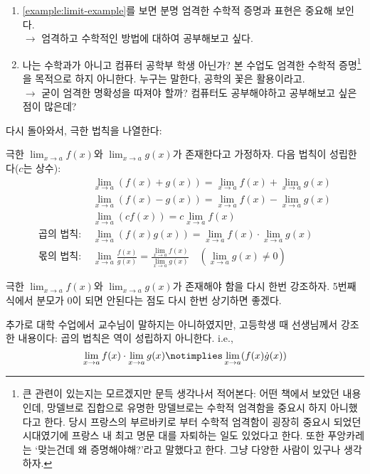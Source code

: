 \documentclass[../note.tex]{subfiles}
\begin{document}
\begin{enumerate}
  \item
    \ref{example:limit-example}를 보면 분명 엄격한 수학적 증명과 표현은 중요해 보인다.\\$\rightarrow$ 엄격하고 수학적인 방법에 대하여 공부해보고 싶다.
  \item
    나는 수학과가 아니고 컴퓨터 공학부 학생 아닌가? 본 수업도 엄격한 수학적 증명\footnote{큰 관련이 있는지는 모르겠지만 문득 생각나서 적어본다: 어떤 책에서 보았던 내용인데, 망델브로 집합으로 유명한 망델브로는 수학적 엄격함을 중요시 하지 아니했다고 한다. 당시 프랑스의 부르바키로 부터 수학적 엄격함이 굉장히 중요시 되었던 시대였기에 프랑스 내 최고 명문 대를 자퇴하는 일도 있었다고 한다. 또한 푸앙카레는 `맞는건데 왜 증명해야해?'라고 말했다고 한다. 그냥 다양한 사람이 있구나 생각하자.}을 목적으로 하지 아니한다. 누구는 말한다, 공학의 꽃은 활용이라고.\\$\rightarrow$ 굳이 엄격한 명확성을 따져야 할까? 컴퓨터도 공부해야하고 공부해보고 싶은 점이 많은데?
\end{enumerate}

다시 돌아와서, 극한 법칙을 나열한다:
\begin{theorem}
  극한 $\lim_{x \to a} f(x)$와 $\lim_{x \to a} g(x)$가 존재한다고 가정하자. 다음 법칙이 성립한다($c$는 상수):
  \begin{align}
    &\lim_{x \to a} (f(x) + g(x)) = \lim_{x \to a} f(x) + \lim_{x \to a} g(x) \\
    &\lim_{x \to a} (f(x) - g(x)) = \lim_{x \to a} f(x) - \lim_{x \to a} g(x) \\
    &\lim_{x \to a} (cf(x)) = c\lim_{x \to a} f(x) \\
    \text{곱의 법칙: }&\lim_{x \to a} (f(x)g(x)) = \lim_{x \to a} f(x) \cdot \lim_{x \to a} g(x) \\
    \text{몫의 법칙: }&\lim_{x \to a} \frac{f(x)}{g(x)} = \frac{\lim_{x \to a} f(x)}{\lim_{x \to a} g(x)}\quad (\lim_{x \to a} g(x) \neq 0)
  \end{align}
\end{theorem}
극한 $\lim_{x \to a} f(x)$와 $\lim_{x \to a} g(x)$가 존재해야 함을 다시 한번 강조하자. 5번째 식에서 분모가 0이 되면 안된다는 점도 다시 한번 상기하면 좋겠다.

추가로 대학 수업에서 교수님이 말하지는 아니하였지만, 고등학생 때 선생님께서 강조한 내용이다: 곱의 법칙은 역이 성립하지 아니한다. i.e.,
\begin{equation}
  \lim_{x \to a} f(x) \cdot \lim_{x \to a} g(x) \notimplies \lim_{x \to a} (f(x) \dot g(x))
\end{equation}
\end{document}
